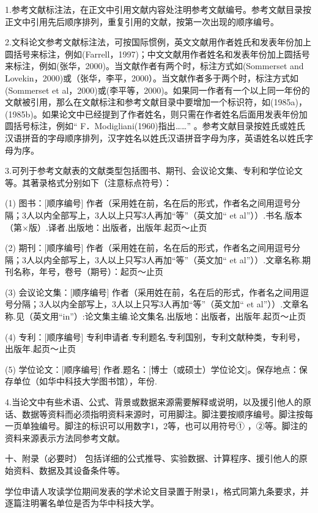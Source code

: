 1.参考文献标注法，在正文中引用文献内容处注明参考文献编号。参考文献目录按正文中引用先后顺序排列，重复引用的文献，按第一次出现的顺序编号。

2.文科论文参考文献标注法，可按国际惯例，英文文献用作者姓氏和发表年份加上圆括号来标注，例如(Farrell，1997)；中文文献用作者姓名和发表年份加上圆括号来标注，例如(张华，2000)。当文献作者有两个时，标注方式如(Sommerset and Lovekin，2000)或（张华，李平，2000）。当文献作者多于两个时，标注方式如(Sommerset et al，2000)或(李平等，2000)。如果同一作者有一个以上同一年份的文献被引用，那么在文献标注和参考文献目录中要增加一个标识符，如(1985a)，(1985b)。如果论文中已经提到了作者姓名，则只需在作者姓名后面用发表年份加圆括号标注，例如“ F．Modigliani(1960)指出……” 。参考文献目录按姓氏或姓氏汉语拼音的字母顺序排列，汉字姓名以姓氏汉语拼音字母为序，英语姓名以姓氏字母为序。

3.可列于参考文献表的文献类型包括图书、期刊、会议论文集、专利和学位论文等。其著录格式分别如下（注意标点符号）：

(1) 图书：[顺序编号] 作者（采用姓在前，名在后的形式，作者名之间用逗号分隔；3人以内全部写上，3人以上只写3人再加“等”（英文加“ et al”））.书名.版本（第×版）.译者.出版地：出版者，出版年.起页～止页

(2) 期刊：[顺序编号] 作者（采用姓在前，名在后的形式，作者名之间用逗号分隔；3人以内全部写上，3人以上只写3人再加“等”（英文加“ et al”））.文章名称.期刊名称，年号，卷号（期号）：起页～止页

(3) 会议论文集：[顺序编号] 作者（采用姓在前，名在后的形式，作者名之间用逗号分隔；3人以内全部写上，3人以上只写3人再加“等”（英文加“ et al”））.文章名称.见（英文用“in”）:论文集主编.论文集名.出版地：出版者，出版年.起页～止页

(4) 专利：[顺序编号] 专利申请者.专利题名.专利国别，专利文献种类，专利号，出版年.起页～止页

(5) 学位论文：[顺序编号] 作者.题名：[博士（或硕士）学位论文]。保存地点：保存单位（如华中科技大学图书馆），年份.

4.当论文中有些术语、公式、背景或数据来源需要解释或说明，以及援引他人的原话、数据等资料而必须指明资料来源时，可用脚注。脚注要按顺序编号。脚注按每一页单独编号。脚注的标识可以用数字1，2等，也可以用符号① ，②等。脚注的资料来源表示方法同参考文献。

十、附录（必要时）
包括详细的公式推导、实验数据、计算程序、援引他人的原始资料、数据及其设备条件等。

学位申请人攻读学位期间发表的学术论文目录置于附录1，格式同第九条要求，并逐篇注明署名单位是否为华中科技大学。

